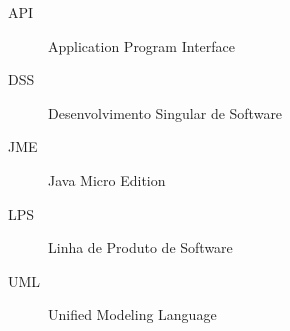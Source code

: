 
\begin{description}
  \item[API] Application Program Interface
  \item[DSS] Desenvolvimento Singular de Software
  \item[JME] Java Micro Edition
  \item[LPS] Linha de Produto de Software
  \item[UML] Unified Modeling Language
\end{description}
